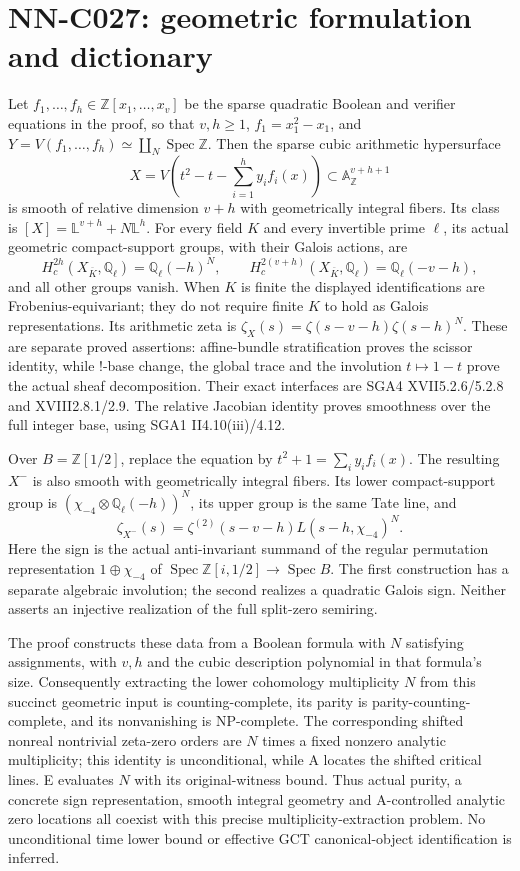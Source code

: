 \section{NN-C027: geometric formulation and dictionary}
\begin{geometricstatement}[NN-C027]
Let $f_1,\ldots,f_h\in\mathbb Z[x_1,\ldots,x_v]$ be the sparse quadratic Boolean and verifier equations in the proof, so that $v,h\geq1$, $f_1=x_1^2-x_1$, and $Y=V(f_1,\ldots,f_h)\simeq\coprod_N\operatorname{Spec}\mathbb Z$. Then the sparse cubic arithmetic hypersurface
\[
 X=V\left(t^2-t-\sum_{i=1}^h y_i f_i(x)\right)
             \subset\mathbb A^{v+h+1}_\mathbb Z
\]
is smooth of relative dimension $v+h$ with geometrically integral fibers. Its class is $[X]=\mathbb L^{v+h}+N\mathbb L^h$. For every field $K$ and every invertible prime $\ell$, its actual geometric compact-support groups, with their Galois actions, are
\[
 H_c^{2h}(X_{\overline K},\mathbb Q_\ell)=\mathbb Q_\ell(-h)^N,
 \qquad
 H_c^{2(v+h)}(X_{\overline K},\mathbb Q_\ell)=\mathbb Q_\ell(-v-h),
\]
and all other groups vanish. When $K$ is finite the displayed identifications are Frobenius-equivariant; they do not require finite $K$ to hold as Galois representations. Its arithmetic zeta is
$\zeta_X(s)=\zeta(s-v-h)\zeta(s-h)^N$.
These are separate proved assertions: affine-bundle stratification proves the scissor identity, while !-base change, the global trace and the involution $t\mapsto1-t$ prove the actual sheaf decomposition. Their exact interfaces are SGA4 XVII5.2.6/5.2.8 and XVIII2.8.1/2.9. The relative Jacobian identity proves smoothness over the full integer base, using SGA1 II4.10(iii)/4.12.

Over $B=\mathbb Z[1/2]$, replace the equation by $t^2+1=\sum_i y_i f_i(x)$. The resulting $X^-$ is also smooth with geometrically integral fibers. Its lower compact-support group is $(\chi_{-4}\otimes\mathbb Q_\ell(-h))^N$, its upper group is the same Tate line, and
\[
 \zeta_{X^-}(s)=\zeta^{(2)}(s-v-h)L(s-h,\chi_{-4})^N.
\]
Here the sign is the actual anti-invariant summand of the regular permutation representation $1\oplus\chi_{-4}$ of $\operatorname{Spec}\mathbb Z[i,1/2]\to\operatorname{Spec}B$. The first construction has a separate algebraic involution; the second realizes a quadratic Galois sign. Neither asserts an injective realization of the full split-zero semiring.

The proof constructs these data from a Boolean formula with $N$ satisfying assignments, with $v,h$ and the cubic description polynomial in that formula's size. Consequently extracting the lower cohomology multiplicity $N$ from this succinct geometric input is counting-complete, its parity is parity-counting-complete, and its nonvanishing is NP-complete. The corresponding shifted nonreal nontrivial zeta-zero orders are $N$ times a fixed nonzero analytic multiplicity; this identity is unconditional, while A locates the shifted critical lines. E evaluates $N$ with its original-witness bound. Thus actual purity, a concrete sign representation, smooth integral geometry and A-controlled analytic zero locations all coexist with this precise multiplicity-extraction problem. No unconditional time lower bound or effective GCT canonical-object identification is inferred.
\end{geometricstatement}

